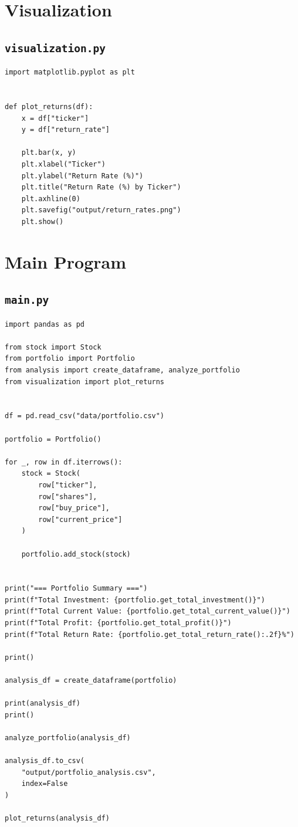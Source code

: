 \documentclass[11pt,a4paper]{article}
\begin{document}
\section{Visualization}

\subsection{\texttt{visualization.py}}

\begin{lstlisting}
import matplotlib.pyplot as plt


def plot_returns(df):
    x = df["ticker"]
    y = df["return_rate"]

    plt.bar(x, y)
    plt.xlabel("Ticker")
    plt.ylabel("Return Rate (%)")
    plt.title("Return Rate (%) by Ticker")
    plt.axhline(0)
    plt.savefig("output/return_rates.png")
    plt.show()
\end{lstlisting}

\section{Main Program}

\subsection{\texttt{main.py}}

\begin{lstlisting}
import pandas as pd

from stock import Stock
from portfolio import Portfolio
from analysis import create_dataframe, analyze_portfolio
from visualization import plot_returns


df = pd.read_csv("data/portfolio.csv")

portfolio = Portfolio()

for _, row in df.iterrows():
    stock = Stock(
        row["ticker"],
        row["shares"],
        row["buy_price"],
        row["current_price"]
    )

    portfolio.add_stock(stock)


print("=== Portfolio Summary ===")
print(f"Total Investment: {portfolio.get_total_investment()}")
print(f"Total Current Value: {portfolio.get_total_current_value()}")
print(f"Total Profit: {portfolio.get_total_profit()}")
print(f"Total Return Rate: {portfolio.get_total_return_rate():.2f}%")

print()

analysis_df = create_dataframe(portfolio)

print(analysis_df)
print()

analyze_portfolio(analysis_df)

analysis_df.to_csv(
    "output/portfolio_analysis.csv",
    index=False
)

plot_returns(analysis_df)
\end{lstlisting}
\end{document}
